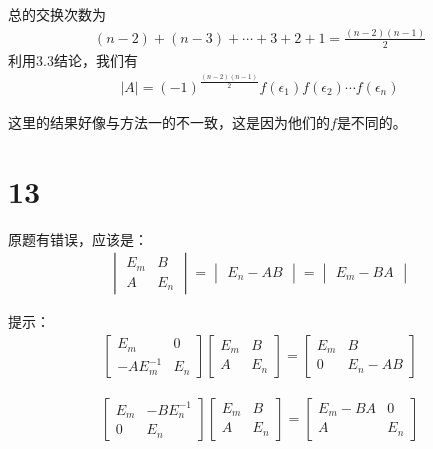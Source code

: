 \documentclass{article}
\begin{document}
\begin{itemize}
\begin{itemize}
                总的交换次数为
                \begin{align*}
                  (n-2) + (n - 3) + \cdots + 3 + 2 + 1 = \frac{(n-2)(n-1)}{2}
                \end{align*}
                利用3.3结论，我们有
                \begin{align*}
                  |A| = (-1)^{\frac{(n-2)(n-1)}{2}} f(\epsilon_1)f(\epsilon_2)\cdots f(\epsilon_n)
                \end{align*}

                这里的结果好像与方法一的不一致，这是因为他们的$f$是不同的。
        \end{itemize}
\end{itemize}

\section*{13}

原题有错误，应该是：
\begin{align*}
  \begin{vmatrix}
    E_m & B   \\
    A   & E_n
  \end{vmatrix}
  = \begin{vmatrix}
      E_n - AB
    \end{vmatrix}
  = \begin{vmatrix}
      E_m - BA
    \end{vmatrix}
\end{align*}

提示：
\begin{align*}
  \begin{bmatrix}
    E_m        & 0   \\
    -AE_m^{-1} & E_n
  \end{bmatrix}
  \begin{bmatrix}
    E_m & B   \\
    A   & E_n
  \end{bmatrix}
  = \begin{bmatrix}
      E_m & B        \\
      0   & E_n - AB
    \end{bmatrix}
\end{align*}

\begin{align*}
  \begin{bmatrix}
    E_m & - B E_n^{-1} \\
    0   & E_n
  \end{bmatrix}
  \begin{bmatrix}
    E_m & B   \\
    A   & E_n
  \end{bmatrix}
  = \begin{bmatrix}
      E_m - BA & 0   \\
      A        & E_n
    \end{bmatrix}
\end{align*}
\end{document}
